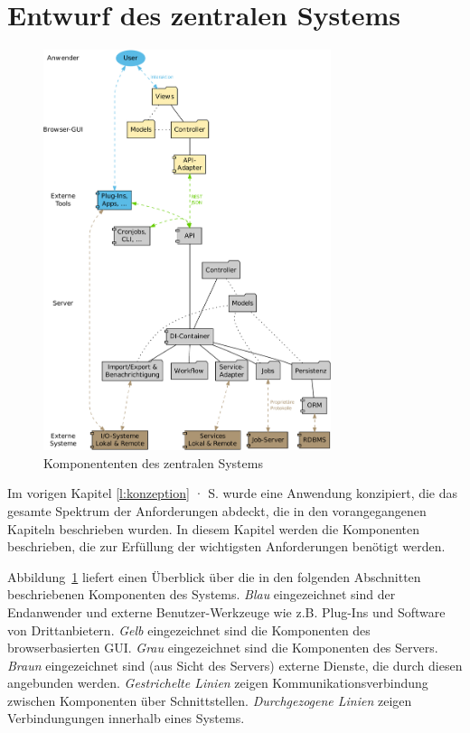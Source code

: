 \section{Entwurf des zentralen Systems}\label{l:entwurf}

\begin{figure}[htb]
\begin{center}
\includegraphics[width=0.75\textwidth]{media/komponenten.pdf}
\end{center}
\caption{Komponententen des zentralen Systems}
\label{chart:komponenten}
\end{figure}

Im vorigen Kapitel \ref{l:konzeption} · S.\pageref{l:konzeption} wurde eine Anwendung konzipiert, die das gesamte Spektrum der Anforderungen abdeckt, die in den vorangegangenen Kapiteln beschrieben wurden. In diesem Kapitel werden die Komponenten beschrieben, die zur Erfüllung der wichtigsten Anforderungen benötigt werden.

Abbildung~\ref{chart:komponenten} liefert einen Überblick über die in den folgenden Abschnitten beschriebenen Komponenten des Systems. \emph{Blau} eingezeichnet sind der Endanwender und externe Benutzer-Werkzeuge wie z.B. Plug-Ins und Software von Drittanbietern. \emph{Gelb} eingezeichnet sind die Komponenten des browserbasierten GUI. \emph{Grau} eingezeichnet sind die Komponenten des Servers. \emph{Braun} eingezeichnet sind (aus Sicht des Servers) externe Dienste, die durch diesen angebunden werden. \emph{Gestrichelte Linien} zeigen Kommunikationsverbindung zwischen Komponenten über Schnittstellen. \emph{Durchgezogene Linien} zeigen Verbindungungen innerhalb eines Systems. 

